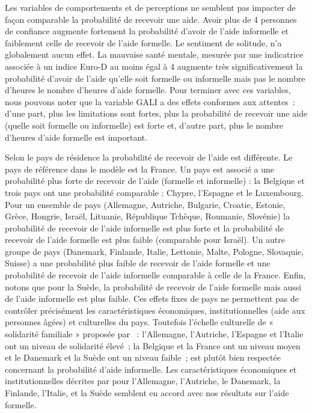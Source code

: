 \begin{Article}
\begin{refsection}[Bonnal]
Les variables de comportements et de perceptions ne semblent pas impacter de façon comparable la probabilité de recevoir une aide. Avoir plus de 4 personnes de confiance augmente fortement la probabilité d'avoir de l'aide informelle et faiblement celle de recevoir de l'aide formelle. Le sentiment de solitude, n'a globalement aucun effet. La mauvaise santé mentale, mesurée par une indicatrice associée à un indice Euro-D au moins égal à 4 augmente très significativement la probabilité d'avoir de l'aide qu'elle soit formelle ou informelle mais pas le nombre d'heures le nombre d'heures d'aide formelle. Pour terminer avec ces variables, nous pouvons noter que la variable GALI a des effets conformes aux attentes~: d'une part, plus les limitations sont fortes, plus la probabilité de recevoir une aide (quelle soit formelle ou informelle) est forte et, d'autre part, plus le nombre d'heures d'aide formelle est important.

Selon le pays de résidence la probabilité de recevoir de l'aide est différente. Le pays de référence dans le modèle est la France. Un pays est associé a une probabilité plus forte de recevoir de l'aide (formelle et informelle) : la Belgique et trois pays ont une probabilité comparable : Chypre, l'Espagne et le Luxembourg. Pour un ensemble de pays (Allemagne, Autriche, Bulgarie, Croatie, Estonie, Grèce, Hongrie, Israël, Lituanie, République Tchèque, Roumanie, Slovénie) la probabilité de recevoir de l'aide informelle est plus forte et la probabilité de recevoir de l'aide formelle est plus faible (comparable pour Israël). Un autre groupe de pays (Danemark, Finlande, Italie, Lettonie, Malte, Pologne, Slovaquie, Suisse) a une probabilité plus faible de recevoir de l'aide formelle et une probabilité de recevoir de l'aide informelle comparable à celle de la France. Enfin, notons que pour la Suède, la probabilité de recevoir de l'aide formelle mais aussi de l'aide informelle est plus faible. Ces effets fixes de pays ne permettent pas de contrôler précisément les caractéristiques économiques, institutionnelles (aide aux personnes âgées) et culturelles du pays. Toutefois l’échelle culturelle de « solidarité familiale » proposée par \textcite{GEERTS2012}~: l’Allemagne, l’Autriche, l’Espagne et l’Italie ont un niveau de solidarité élevé~; la Belgique et la France ont un niveau moyen et le Danemark et la Suède ont un niveau faible~; est plutôt bien respectée concernant la probabilité d’aide informelle. Les caractéristiques économiques et institutionnelles décrites par \textcite{rostgaard2011} pour l’Allemagne, l’Autriche, le Danemark, la Finlande, l’Italie, et la Suède semblent en accord avec nos résultats sur l'aide formelle.


\end{refsection}
\end{Article}
